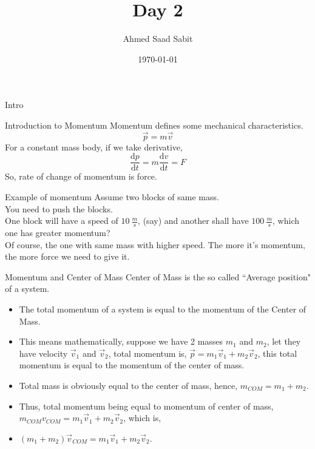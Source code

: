 \documentclass[9pt]{memoir}
\title{Day 2} \author{Ahmed Saad Sabit} \date{\today}
\begin{document}
\begin{frame}{Intro} \titlepage  \end{frame}



\begin{frame}{ Introduction to Momentum} 
    Momentum defines some mechanical characteristics. 
    \[ \vec p = m \vec v  \]
    For a constant mass body, if we take derivative, 
    \[ \frac{\mathrm d p}{\mathrm d t} = m \frac{\mathrm d v}{ \mathrm d t} = F \]
    So, rate of change of momentum is force.        
\end{frame}





\begin{frame}
    { Example of momentum}
    Assume two blocks of same mass.\\
    You need to push the blocks.\\
    One block will have a speed of $10 \ \frac{m}{s}$, (say) and another shall have $100 \ \frac{m}{s}$, which one has greater momentum?\\ 
    Of course, the one with same mass with higher speed. 
    The more it's momentum, the more force we need to give it. 
\end{frame}




\begin{frame}
    { Momentum and Center of Mass}
    Center of Mass is the so called ``Average position" of a system. \\ 
    \begin{itemize}
        \item The total momentum of a system is equal to the momentum of the Center of Mass.  
        \item This means mathematically, suppose we have 2 masses $m_1 $ and $m_2$, let they have velocity $\vec v_1$ and $\vec v_2$, total momentum is, $\vec p = m_1 \vec v_1 + m_2 \vec v_2$, this total momentum is equal to the momentum of the center of mass.  
        \item Total mass is obviously equal to the center of mass, hence, $ m_{ COM} = m_1 + m_2  $.  
        \item Thus, total momentum being equal to momentum of center of mass, $m_{ COM} v_{ COM} = m_1 \vec v_1 + m_2 \vec v_2  $, which is, 
        \item $(m_1 + m_2) \vec{ v}_{ COM}  = m_1 \vec v_1 + m_2 \vec v_2 $.
    \end{itemize}
\end{frame}
\end{document}
